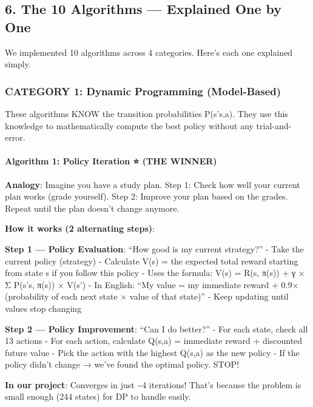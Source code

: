 \documentclass[
]{article}
\begin{document}
\hypertarget{the-10-algorithms-explained-one-by-one}{%
\subsection{6. The 10 Algorithms --- Explained One by
One}\label{the-10-algorithms-explained-one-by-one}}

We implemented 10 algorithms across 4 categories. Here's each one
explained simply.

\hypertarget{category-1-dynamic-programming-model-based}{%
\subsubsection{CATEGORY 1: Dynamic Programming
(Model-Based)}\label{category-1-dynamic-programming-model-based}}

These algorithms KNOW the transition probabilities P(s'\textbar s,a).
They use this knowledge to mathematically compute the best policy
without any trial-and-error.

\hypertarget{algorithm-1-policy-iteration-the-winner}{%
\paragraph{Algorithm 1: Policy Iteration ⭐ (THE
WINNER)}\label{algorithm-1-policy-iteration-the-winner}}

\textbf{Analogy}: Imagine you have a study plan. Step 1: Check how well
your current plan works (grade yourself). Step 2: Improve your plan
based on the grades. Repeat until the plan doesn't change anymore.

\textbf{How it works (2 alternating steps)}:

\textbf{Step 1 --- Policy Evaluation}: ``How good is my current
strategy?'' - Take the current policy (strategy) - Calculate V(s) = the
expected total reward starting from state s if you follow this policy -
Uses the formula: V(s) = R(s, π(s)) + γ × Σ P(s'\textbar s, π(s)) ×
V(s') - In English: ``My value = my immediate reward + 0.9× (probability
of each next state × value of that state)'' - Keep updating until values
stop changing

\textbf{Step 2 --- Policy Improvement}: ``Can I do better?'' - For each
state, check all 13 actions - For each action, calculate Q(s,a) =
immediate reward + discounted future value - Pick the action with the
highest Q(s,a) as the new policy - If the policy didn't change → we've
found the optimal policy. STOP!

\textbf{In our project}: Converges in just \textasciitilde4 iterations!
That's because the problem is small enough (244 states) for DP to handle
easily.
\end{document}
